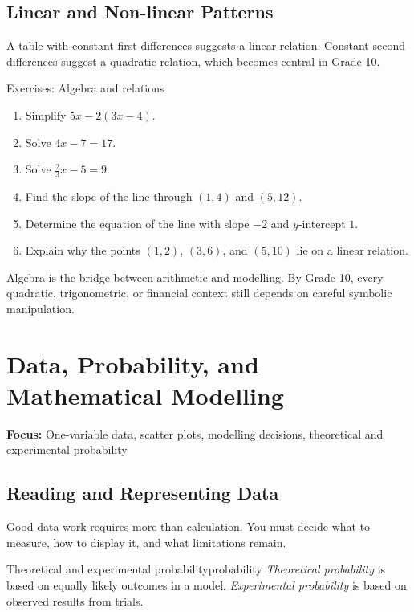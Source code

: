 \documentclass[11pt,oneside]{book}
\newcommand{\topicline}[1]{\medskip\noindent\textbf{Focus:} #1\par\medskip}
\begin{document}
\section{Linear and Non-linear Patterns}
A table with constant first differences suggests a linear relation. Constant second differences suggest a quadratic relation, which becomes central in Grade 10.

\begin{exercisebox}{Exercises: Algebra and relations}
\begin{enumerate}
  \item Simplify $5x-2(3x-4)$.
  \item Solve $4x-7=17$.
  \item Solve $\frac{2}{3}x-5=9$.
  \item Find the slope of the line through $(1,4)$ and $(5,12)$.
  \item Determine the equation of the line with slope $-2$ and $y$-intercept $1$.
  \item Explain why the points $(1,2)$, $(3,6)$, and $(5,10)$ lie on a linear relation.
\end{enumerate}
\end{exercisebox}

\begin{summarybox}
Algebra is the bridge between arithmetic and modelling. By Grade 10, every quadratic, trigonometric, or financial context still depends on careful symbolic manipulation.
\end{summarybox}

\chapter{Data, Probability, and Mathematical Modelling}
\topicline{One-variable data, scatter plots, modelling decisions, theoretical and experimental probability}

\section{Reading and Representing Data}
Good data work requires more than calculation. You must decide what to measure, how to display it, and what limitations remain.

\begin{definition}{Theoretical and experimental probability}{probability}
\emph{Theoretical probability} is based on equally likely outcomes in a model. \emph{Experimental probability} is based on observed results from trials.
\end{definition}
\end{document}
